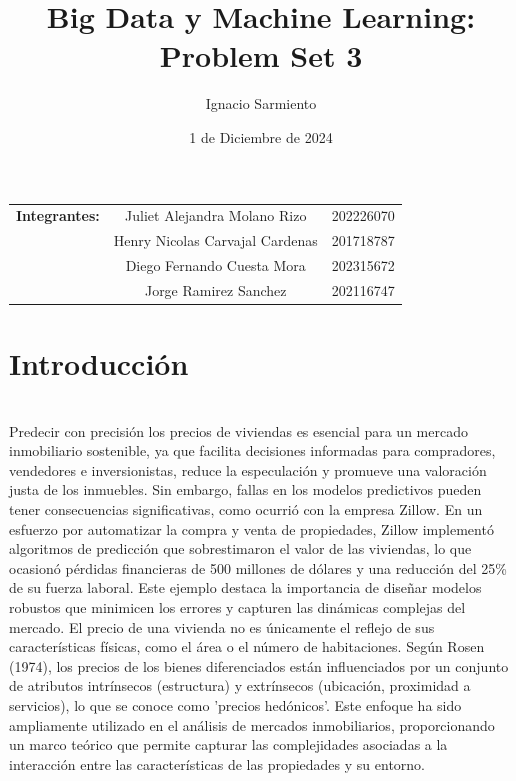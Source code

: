 \documentclass[a4paper]{article}
\title{Big Data y Machine Learning: Problem Set 3}
\author{Ignacio Sarmiento}
\date{1 de Diciembre de 2024}
\theoremstyle{remark}
\theoremstyle{definition}
\begin{document}
\maketitle
\begin{center}

\begin{tabular}{ c c c }
 \textbf{Integrantes:} & Juliet Alejandra Molano Rizo & 202226070 \\
 & Henry Nicolas Carvajal Cardenas & 201718787\\
 & Diego Fernando Cuesta Mora & 202315672\\
 & Jorge Ramirez Sanchez & 202116747
\end{tabular}

\end{center}

\section{Introducción} \\

Predecir con precisión los precios de viviendas es esencial para un mercado inmobiliario sostenible, ya que facilita decisiones informadas para compradores, vendedores e inversionistas, reduce la especulación y promueve una valoración justa de los inmuebles. Sin embargo, fallas en los modelos predictivos pueden tener consecuencias significativas, como ocurrió con la empresa Zillow. En un esfuerzo por automatizar la compra y venta de propiedades, Zillow implementó algoritmos de predicción que sobrestimaron el valor de las viviendas, lo que ocasionó pérdidas financieras de 500 millones de dólares y una reducción del 25\% de su fuerza laboral. Este ejemplo destaca la importancia de diseñar modelos robustos que minimicen los errores y capturen las dinámicas complejas del mercado. El precio de una vivienda no es únicamente el reflejo de sus características físicas, como el área o el número de habitaciones. Según Rosen (1974), los precios de los bienes diferenciados están influenciados por un conjunto de atributos intrínsecos (estructura) y extrínsecos (ubicación, proximidad a servicios), lo que se conoce como 'precios hedónicos'. Este enfoque ha sido ampliamente utilizado en el análisis de mercados inmobiliarios, proporcionando un marco teórico que permite capturar las complejidades asociadas a la interacción entre las características de las propiedades y su entorno.\\
\end{document}
